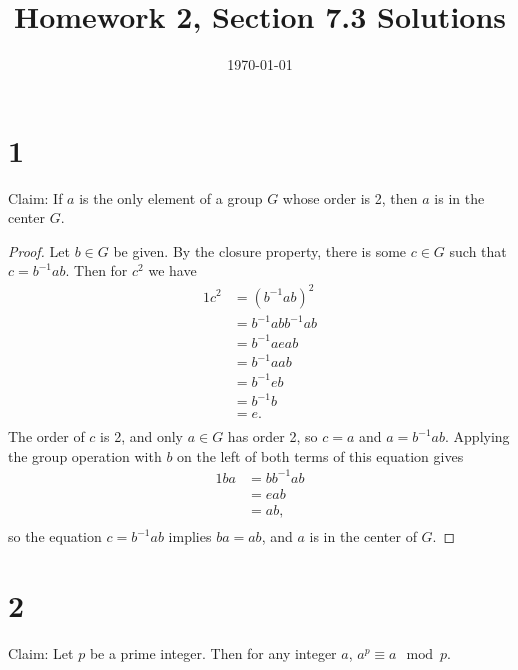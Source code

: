 \documentclass{article}
\title{\textbf{Homework 2, Section 7.3 Solutions}}
\date{}
\date\today
\begin{document}
\maketitle %

\thispagestyle{firstpage}
\section*{1}

Claim: If $a$ is the only element of a group $G$ whose order is 2, then $a$ is in the center $G$.

\begin{proof}
    Let $b \in G$ be given.  By the closure property, there is some $c \in G$ such that 
    $c = b^{-1}ab$.  Then for $c^2$ we have
    \begin{alignat*}{1}
        c^2 &= (b^{-1}ab)^2 \\ 
        &= b^{-1}abb^{-1}ab \\ 
        &= b^{-1}aeab \\ 
        &= b^{-1}aab \\ 
        &= b^{-1}eb \\ 
        &= b^{-1}b \\ 
        &= e. \\
    \end{alignat*} 
    The order of $c$ is 2, and only $a \in G$ has order 2, so $c = a$ and $a = b^{-1}ab$.  
    Applying the group operation with $b$ on the left of both terms of this equation gives 
    \begin{alignat*}{1}
        ba &= bb^{-1}ab \\ 
        &= eab \\ 
        &= ab, \\ 
    \end{alignat*}
    so the equation $c = b^{-1}ab$ implies $ba = ab$, and $a$ is in the center of $G$.
\end{proof}

\section*{2}

Claim: Let $p$ be a prime integer.  Then for any integer $a$, $a^p \equiv a \mod{p}$.
\end{document}
